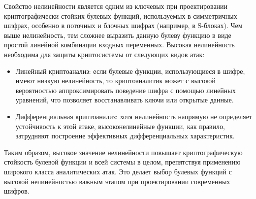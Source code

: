 Свойство нелинейности является одним из ключевых при проектировании криптографически стойких булевых функций, используемых в симметричных шифрах, особенно в поточных и блочных шифрах (например, в S-блоках). Чем выше нелинейность, тем сложнее выразить данную булеву функцию в виде простой линейной комбинации входных переменных. Высокая нелинейность необходима для защиты криптосистемы от следующих видов атак:
\begin{itemize}
    \item Линейный криптоанализ: если булевые функции, использующиеся в шифре, имеют низкую нелинейность, то криптоаналитик может с высокой вероятностью аппроксимировать поведение шифра с помощью линейных уравнений, что позволяет восстанавливать ключи или открытые данные.
    \item Дифференциальная криптоанализ: хотя нелинейность напрямую не определяет устойчивость к этой атаке, высоконелинейные функции, как правило, затрудняют построение эффективных дифференциальных характеристик.
\end{itemize}

Таким образом, высокое значение нелинейности повышает криптографическую стойкость булевой функции и всей системы в целом, препятствуя применению широкого класса аналитических атак. Это делает выбор булевых функций с высокой нелинейностью важным этапом при проектировании современных шифров.

